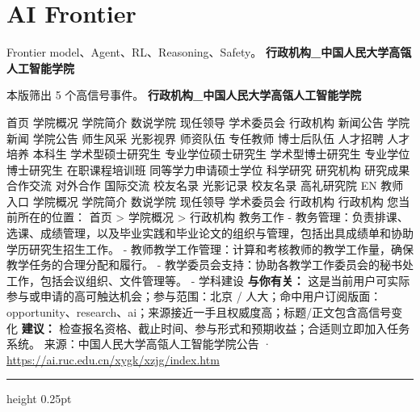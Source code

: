 \documentclass[10.5pt]{ctexart}
\begin{document}
\section*{AI Frontier}
{\color{ormuted} Frontier model、Agent、RL、Reasoning、Safety。}
\vspace{2mm}
{\LARGE\bfseries 行政机构\_中国人民大学高瓴人工智能学院}\par
\vspace{1mm}
{\color{ormuted} 本版筛出 5 个高信号事件。}
\vspace{3mm}
{\Large\bfseries 行政机构\_中国人民大学高瓴人工智能学院}\par
首页 学院概况 学院简介 数说学院 现任领导 学术委员会 行政机构 新闻公告 学院新闻 学院公告 师生风采 光影视界 师资队伍 专任教师 博士后队伍 人才招聘 人才培养 本科生 学术型硕士研究生 专业学位硕士研究生 学术型博士研究生 专业学位博士研究生 在职课程培训班 同等学力申请硕士学位 科学研究 研究机构 研究成果 合作交流 对外合作 国际交流 校友名录 光影记录 校友名录 高礼研究院 EN 教师入口 学院概况 学院简介 数说学院 现任领导 学术委员会 行政机构 行政机构 您当前所在的位置： 首页 > 学院概况 > 行政机构 教务工作 - 教务管理：负责排课、选课、成绩管理，以及毕业实践和毕业论文的组织与管理，包括出具成绩单和协助学历研究生招生工作。 - 教师教学工作管理：计算和考核教师的教学工作量，确保教学任务的合理分配和履行。 - 教学委员会支持：协助各教学工作委员会的秘书处工作，包括会议组织、文件管理等。 - 学科建设
\textbf{与你有关：} 这是当前用户可实际参与或申请的高可触达机会；参与范围：北京 / 人大；命中用户订阅版面：opportunity、research、ai；来源接近一手且权威度高；标题/正文包含高信号变化
\textbf{建议：} 检查报名资格、截止时间、参与形式和预期收益；合适则立即加入任务系统。
{\footnotesize\color{ormuted} 来源：中国人民大学高瓴人工智能学院公告 · \url{https://ai.ruc.edu.cn/xygk/xzjg/index.htm}}
\vspace{4mm}
\hrule height 0.25pt
\vspace{3mm}
\end{document}
